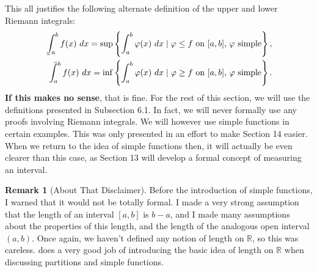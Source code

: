 \documentclass{article}
\def\upint{\mathchoice%
	{\mkern13mu\overline{\vphantom{\intop}\mkern7mu}\mkern-20mu}%
	{\mkern7mu\overline{\vphantom{\intop}\mkern7mu}\mkern-14mu}%
	{\mkern7mu\overline{\vphantom{\intop}\mkern7mu}\mkern-14mu}%
	{\mkern7mu\overline{\vphantom{\intop}\mkern7mu}\mkern-14mu}%
	\int}
\def\lowint{\mkern3mu\underline{\vphantom{\intop}\mkern7mu}\mkern-10mu\int}
\newcommand{\R}{\mathbb{R}}
\theoremstyle{definition}
\newtheorem{remark}{Remark}[section]
\begin{document}
	This all justifies the following alternate definition of the upper and lower Riemann integrals:
	\begin{align*}
		\lowint_a^b f(x)\ dx=\sup \left\{\int_a^b\varphi(x)\ dx\mid \varphi\le f\text{ on }[a,b]\text{, } \varphi\text{ simple}\right\},\\
		\upint_a^b f(x)\ dx=\inf\left\{\int_a^b\varphi(x)\ dx\mid \varphi\ge f\text{ on }[a,b]\text{, } \varphi\text{ simple}\right\}.
	\end{align*} 
	\textbf{\color{red}If this makes no sense}, that is fine. For the rest of this section, we will use the definitions presented in Subsection 6.1. In fact, we will never formally use any proofs involving Riemann integrals. We will however use simple functions in certain examples. This was only presented in an effort to make Section 14 easier. When we return to the idea of simple functions then, it will actually be even clearer than this case, as Section 13 will develop a formal concept of measuring an interval.  
	\begin{remark}[About That Disclaimer]
		Before the introduction of simple functions, I warned that it would not be totally formal. I made a very strong assumption that the length of an interval $ [a,b] $ is $ b-a $, and I made many assumptions about the properties of this length, and the length of the analogous open interval $ (a,b) $. Once again, we haven't defined any notion of length on $ \R $, so this was careless. \cite{tao2006analysis} does a very good job of introducing the basic idea of length on $ \R $ when discussing partitions and simple functions. 
	\end{remark}
\end{document}
